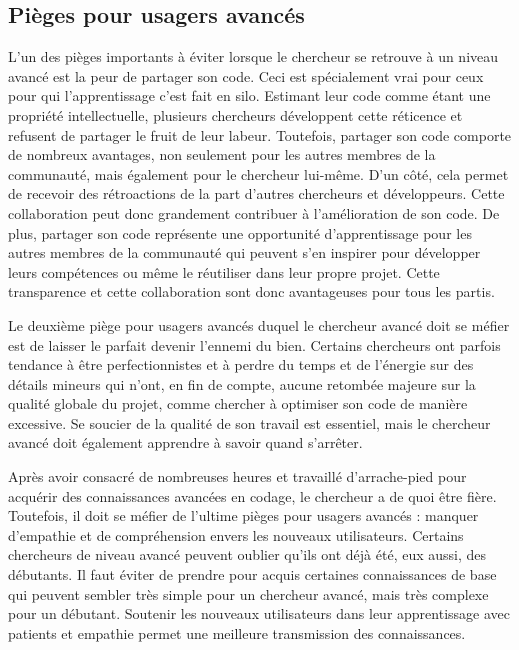 \documentclass[
  letterpaper,
  DIV=11,
  numbers=noendperiod]{scrreprt}
\begin{document}
\hypertarget{piuxe8ges-pour-usagers-avancuxe9s}{%
\subsection{Pièges pour usagers
avancés}\label{piuxe8ges-pour-usagers-avancuxe9s}}

L'un des pièges importants à éviter lorsque le chercheur se retrouve à
un niveau avancé est la peur de partager son code. Ceci est spécialement
vrai pour ceux pour qui l'apprentissage c'est fait en silo. Estimant
leur code comme étant une propriété intellectuelle, plusieurs chercheurs
développent cette réticence et refusent de partager le fruit de leur
labeur. Toutefois, partager son code comporte de nombreux avantages, non
seulement pour les autres membres de la communauté, mais également pour
le chercheur lui-même. D'un côté, cela permet de recevoir des
rétroactions de la part d'autres chercheurs et développeurs. Cette
collaboration peut donc grandement contribuer à l'amélioration de son
code. De plus, partager son code représente une opportunité
d'apprentissage pour les autres membres de la communauté qui peuvent
s'en inspirer pour développer leurs compétences ou même le réutiliser
dans leur propre projet. Cette transparence et cette collaboration sont
donc avantageuses pour tous les partis.

Le deuxième piège pour usagers avancés duquel le chercheur avancé doit
se méfier est de laisser le parfait devenir l'ennemi du bien. Certains
chercheurs ont parfois tendance à être perfectionnistes et à perdre du
temps et de l'énergie sur des détails mineurs qui n'ont, en fin de
compte, aucune retombée majeure sur la qualité globale du projet, comme
chercher à optimiser son code de manière excessive. Se soucier de la
qualité de son travail est essentiel, mais le chercheur avancé doit
également apprendre à savoir quand s'arrêter.

Après avoir consacré de nombreuses heures et travaillé d'arrache-pied
pour acquérir des connaissances avancées en codage, le chercheur a de
quoi être fière. Toutefois, il doit se méfier de l'ultime pièges pour
usagers avancés : manquer d'empathie et de compréhension envers les
nouveaux utilisateurs. Certains chercheurs de niveau avancé peuvent
oublier qu'ils ont déjà été, eux aussi, des débutants. Il faut éviter de
prendre pour acquis certaines connaissances de base qui peuvent sembler
très simple pour un chercheur avancé, mais très complexe pour un
débutant. Soutenir les nouveaux utilisateurs dans leur apprentissage
avec patients et empathie permet une meilleure transmission des
connaissances.
\end{document}
